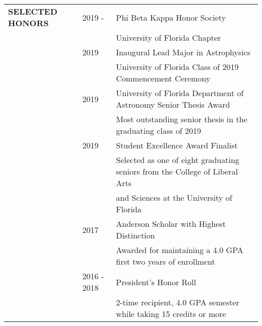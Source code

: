 \documentclass{article}
\begin{document}
\begin{tabular}{p{4cm}p{2.2cm}l}
    \large{\textbf{SELECTED \newline HONORS}} & 2019 - & Phi Beta Kappa Honor Society \vspace{-0.45cm}\\
    && \small University of Florida Chapter \vspace{0.125cm}\\
    
    & 2019 & Inaugural Lead Major in Astrophysics \\
    && \small University of Florida Class of 2019 Commencement Ceremony \vspace{0.125cm}\\
    
    & 2019 & University of Florida Department of Astronomy Senior Thesis Award \\
    && \small Most outstanding senior thesis in the graduating class of 2019 \vspace{0.125cm}\\
    
    & 2019 & Student Excellence Award Finalist \\
    && \small Selected as one of eight graduating seniors from the College of Liberal Arts \\ && \small and Sciences at the University of Florida \vspace{0.125cm}\\
    
    
    & 2017 & Anderson Scholar with Highest Distinction \\
    && \small Awarded for maintaining a 4.0 GPA first two years of enrollment \vspace{0.125cm}\\
    
    & 2016 - 2018 & President's Honor Roll \\
    && \small 2-time recipient, 4.0 GPA semester while taking 15 credits or more \vspace{0.125cm}\\
    
    


\end{tabular}
\end{document}
